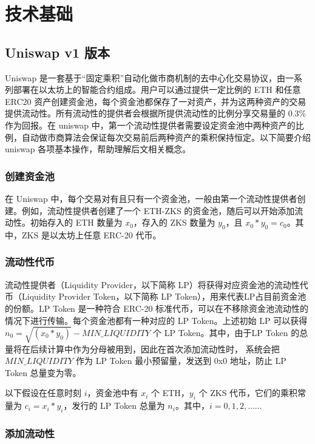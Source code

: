 \documentclass[]{template/llncs}
\begin{document}
\section{技术基础}

\subsection{Uniswap v1 版本}
Uniswap\cite{uniswapv1} 是一套基于“固定乘积”自动化做市商机制的去中心化交易协议，由一系列部署在以太坊上的智能合约组成。用户可以通过提供一定比例的 ETH 和任意 ERC20 资产创建资金池，每个资金池都保存了一对资产，并为这两种资产的交易提供流动性。所有流动性的提供者会根据所提供流动性的比例分享交易量的 0.3\% 作为回报。在 uniswap 中，第一个流动性提供者需要设定资金池中两种资产的比例，自动做市商算法会保证每次交易前后两种资产的乘积保持恒定。以下简要介绍 uniswap 各项基本操作，帮助理解后文相关概念。

\subsubsection{创建资金池}

在 Uniswap 中，每个交易对有且只有一个资金池，一般由第一个流动性提供者创建。例如，流动性提供者创建了一个 ETH-ZKS 的资金池，随后可以开始添加流动性。初始存入的 ETH 数量为 $x_0$，存入的 ZKS 数量为 $y_0$，且 $x_0*y_0 = c_0$。其中，ZKS 是以太坊上任意 ERC-20 代币。

\subsubsection{流动性代币}

流动性提供者（Liquidity Provider，以下简称 LP）将获得对应资金池的流动性代币（Liquidity Provider Token，以下简称 LP Token），用来代表LP占目前资金池的份额。LP Token 是一种符合 ERC-20 标准代币，可以在不移除资金池流动性的情况下进行传输。每个资金池都有一种对应的 LP Token。上述初始 LP 可以获得 $n_0 = \sqrt{(x_0*y_0)} - MIN\_LIQUIDITY$ 个 LP Token。其中，由于LP Token 的总量将在后续计算中作为分母被用到，因此在首次添加流动性时， 系统会把 $MIN\_LIQUIDITY$ 作为 LP Token 最小预留量，发送到 0x0 地址，防止 LP Token 总量变为零。

以下假设在任意时刻 $i$，资金池中有 $x_i$ 个 ETH，$y_i$ 个 ZKS 代币，它们的乘积常量为 $c_i = x_i *y_i$，发行的 LP Token 总量为 $n_i$。其中，$i = 0,1,2,……$

\subsubsection{添加流动性}
\end{document}
